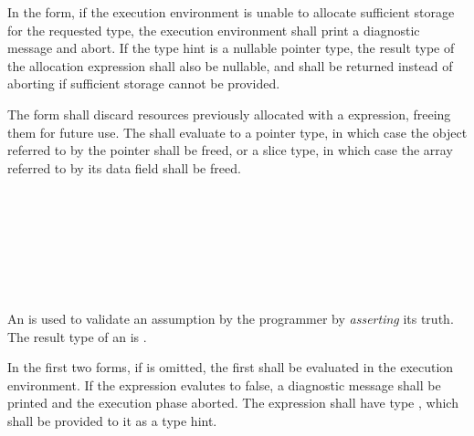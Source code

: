 

\specsubsubitem
In the  form, if the execution environment is unable to
allocate sufficient storage for the requested type, the execution environment
shall print a diagnostic message and abort. If the type hint is a nullable
pointer type, the result type of the allocation expression shall also be
nullable, and  shall be returned instead of aborting if
sufficient storage cannot be provided.

\specsubsubitem
The  form shall discard resources previously allocated with a
 expression, freeing them for future use. The
 shall evaluate to a pointer type, in which case the
object referred to by the pointer shall be freed, or a slice type, in which
case the array referred to by its data field shall be freed.


\begin{grammar}
 \\
	 \terminal{(}  \terminal{)} \\
	 \terminal{(}  \terminal{,}  \terminal{)} \\
	 \terminal{(}  \terminal{)} \\

 \\
	  \\
\end{grammar}

\specsubsubitem
An  is used to validate an assumption by the
programmer by \textit{asserting} its truth. The result type of an
 is .

\specsubsubitem
In the first two forms, if  is omitted, the first
 shall be evaluated in the execution environment. If the
expression evalutes to false, a diagnostic message shall be printed and the
execution phase aborted. The expression shall have type , which
shall be provided to it as a type hint.

